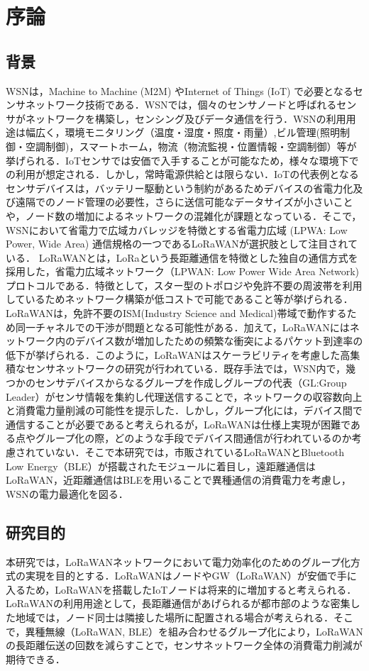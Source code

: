 \chapter{序論}

\section{背景}
WSNは，Machine to Machine (M2M) やInternet of Things (IoT) で必要となるセンサネットワーク技術である．WSNでは，個々のセンサノードと呼ばれるセンサがネットワークを構築し，センシング及びデータ通信を行う．WSNの利用用途は幅広く，環境モニタリング（温度・湿度・照度・雨量）,ビル管理(照明制御・空調制御)，スマートホーム，物流（物流監視・位置情報・空調制御）等が挙げられる\cite{Farooq2018}．IoTセンサでは安価で入手することが可能なため，様々な環境下での利用が想定される．しかし，常時電源供給とは限らない．IoTの代表例となるセンサデバイスは，バッテリー駆動という制約があるためデバイスの省電力化及び遠隔でのノード管理の必要性，さらに送信可能なデータサイズが小さいことや，ノード数の増加によるネットワークの混雑化が課題となっている．そこで，WSNにおいて省電力で広域カバレッジを特徴とする省電力広域 (LPWA: Low Power, Wide Area) 通信規格の一つであるLoRaWANが選択肢として注目されている．
LoRaWANとは，LoRaという長距離通信を特徴とした独自の通信方式を採用した，省電力広域ネットワーク（LPWAN: Low Power Wide Area Network) プロトコルである．特徴として，スター型のトポロジや免許不要の周波帯を利用しているためネットワーク構築が低コストで可能であること等が挙げられる．LoRaWANは，免許不要のISM(Industry Science and Medical)帯域で動作するため同一チャネルでの干渉が問題となる可能性がある\cite{Adelantado2017}．加えて，LoRaWANにはネットワーク内のデバイス数が増加したための頻繁な衝突によるパケット到達率の低下が挙げられる．このように，LoRaWANはスケーラビリティを考慮した高集積なセンサネットワークの研究が行われている．既存手法では，WSN内で，幾つかのセンサデバイスからなるグループを作成しグループの代表（GL:Group Leader）がセンサ情報を集約し代理送信することで，ネットワークの収容数向上と消費電力量削減の可能性を提示した．しかし，グループ化には，デバイス間で通信することが必要であると考えられるが，LoRaWANは仕様上実現が困難である点やグループ化の際，どのような手段でデバイス間通信が行われているのか考慮されていない．そこで本研究では，市販されているLoRaWANとBluetooth Low Energy（BLE）が搭載されたモジュールに着目し，遠距離通信はLoRaWAN，近距離通信はBLEを用いることで異種通信の消費電力を考慮し，WSNの電力最適化を図る．

\section{研究目的}
本研究では，LoRaWANネットワークにおいて電力効率化のためのグループ化方式の実現を目的とする．LoRaWANはノードやGW（LoRaWAN）が安価で手に入るため，LoRaWANを搭載したIoTノードは将来的に増加すると考えられる．LoRaWANの利用用途として，長距離通信があげられるが都市部のような密集した地域では，ノード同士は隣接した場所に配置される場合が考えられる．そこで，異種無線（LoRaWAN, BLE）を組み合わせるグループ化により，LoRaWANの長距離伝送の回数を減らすことで，センサネットワーク全体の消費電力削減が期待できる．

